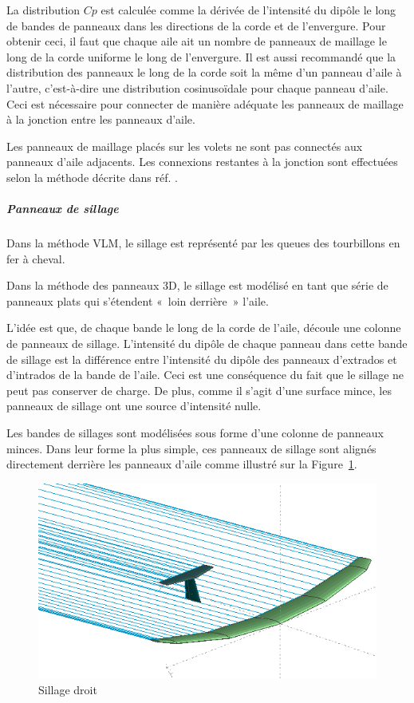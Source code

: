 \documentclass[a4paper,twoside,12pt,dvips]{article}
\begin{document}
La distribution $Cp$ est calculée comme la dérivée de l’intensité du dipôle le long de bandes de panneaux dans les directions de la corde et de l’envergure. Pour obtenir ceci, il faut que chaque aile ait un nombre de panneaux de maillage le long de la corde uniforme le long de l’envergure. Il est aussi recommandé que la distribution des panneaux le long de la corde soit la même d’un panneau d’aile à l’autre, c’est-à-dire une distribution cosinusoïdale  pour chaque panneau d’aile. Ceci est nécessaire pour connecter de manière adéquate les panneaux de maillage à la jonction entre les panneaux d’aile.

Les panneaux de maillage placés sur les volets ne sont pas connectés aux panneaux d’aile adjacents. Les connexions restantes à la jonction sont  effectuées selon la méthode décrite dans réf. \cite{Maskew}. 

\subparagraph{Panneaux de sillage}

Dans la méthode VLM, le sillage est représenté par les queues des tourbillons en
fer à cheval. 

Dans la méthode des panneaux 3D, le sillage est modélisé en tant que série de panneaux plats qui s’étendent «~loin derrière~» l’aile. 

L’idée est que, de chaque bande le long de la corde de l’aile, découle une colonne de panneaux de sillage. L’intensité du dipôle de chaque panneau dans cette bande de sillage est la différence entre l’intensité du dipôle des panneaux d’extrados et d’intrados de la bande de l’aile. Ceci est une conséquence du fait que le sillage ne peut pas conserver de charge. De plus, comme il s’agit d’une surface mince, les panneaux de sillage ont une source d’intensité nulle.

Les bandes de sillages sont modélisées sous forme d’une colonne de panneaux  minces. Dans leur forme la plus simple, ces panneaux de sillage sont alignés  directement derrière les panneaux d’aile comme illustré sur la
Figure~\ref{img:sillage_droit}.

\begin{figure}[htbp]
	\centering
	\includegraphics[width=0.8\linewidth]{img-13}
	\caption{Sillage droit}
	\label{img:sillage_droit}
\end{figure}
\end{document}
